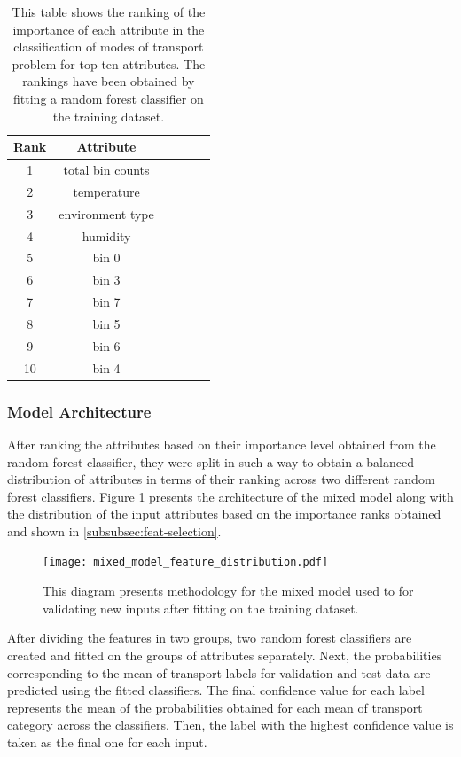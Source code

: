 \documentclass[bsc,frontabs,twoside,singlespacing, parskip,deptreport]{infthesis}     %
\begin{document}
\begin{table}[h!]
\centering
 \begin{tabular}{||c | c | c | c | c | c||} 
 \hline
 Rank & Attribute \\ [0.5ex] 
 \hline\hline
 1 & total bin counts \\ 
 \hline
 2 &  temperature \\
 \hline
 3 &  environment type \\
  \hline
 4 &  humidity \\
  \hline
 5 &  bin 0 \\
  \hline
 6 &  bin 3 \\
  \hline
 7 &  bin 7 \\
 \hline
 8 & bin 5 \\
  \hline
 9 &  bin 6 \\ 
  \hline
 10 &  bin 4 \\
 \hline
 
\end{tabular}
\caption{This table shows the ranking of the importance of each attribute in the classification of modes of transport problem for top ten attributes. The rankings have been obtained by fitting a random forest classifier on the training dataset.}
\label{table:attr-rank}
\end{table}


\subsubsection{Model Architecture}

After ranking the attributes based on their importance level obtained from the random forest classifier, they were split in such a way to obtain a balanced distribution of attributes in terms of their ranking across two different random forest classifiers. Figure \ref{fig:mixed_model_feature_distribution} presents the architecture of the mixed model along with the distribution of the input attributes based on the importance ranks obtained and shown in \ref{subsubsec:feat-selection}.

\begin{figure}[h!]
  \center
  \texttt{[image: mixed\_model\_feature\_distribution.pdf]}
  \caption{This diagram presents methodology for the mixed model used to for validating new inputs after fitting on the training dataset.}
  \label{fig:mixed_model_feature_distribution}
\end{figure}

After dividing the features in two groups, two random forest classifiers are created and fitted on the groups of attributes separately. Next, the probabilities corresponding to the mean of transport labels for validation and test data are predicted using the fitted classifiers. The final confidence value for each label represents the mean of the probabilities obtained for each mean of transport category across the classifiers. Then, the label with the highest confidence value is taken as the final one for each input.
\end{document}

